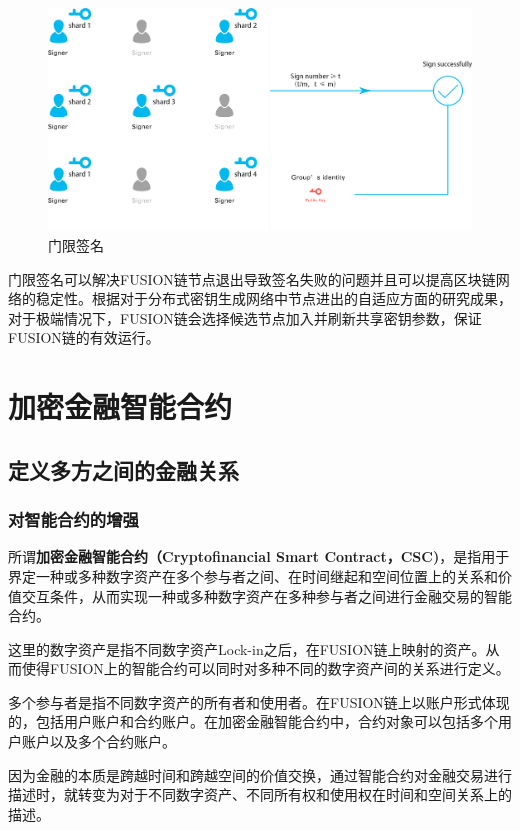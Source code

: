 \documentclass[a4paper,12pt]{article}
\begin{document}
\begin{figure}[htbp]
\centering\includegraphics[width=5in]{pic/thresholdsign.png}
\caption{门限签名}\label{fig:1}
\end{figure}

门限签名可以解决FUSION链节点退出导致签名失败的问题并且可以提高区块链网络的稳定性。根据对于分布式密钥生成网络中节点进出的自适应方面的研究成果\citep{Zhajun2010}，对于极端情况下，FUSION链会选择候选节点加入并刷新共享密钥参数，保证FUSION链的有效运行。

\section{加密金融智能合约}

\subsection{定义多方之间的金融关系}

\subsubsection{对智能合约的增强}

所谓{\bfseries{加密金融智能合约（Cryptofinancial Smart Contract，CSC)}}，是指用于界定一种或多种数字资产在多个参与者之间、在时间继起和空间位置上的关系和价值交互条件，从而实现一种或多种数字资产在多种参与者之间进行金融交易的智能合约。

这里的数字资产是指不同数字资产Lock-in之后，在FUSION链上映射的资产。从而使得FUSION上的智能合约可以同时对多种不同的数字资产间的关系进行定义。

多个参与者是指不同数字资产的所有者和使用者。在FUSION链上以账户形式体现的，包括用户账户和合约账户。在加密金融智能合约中，合约对象可以包括多个用户账户以及多个合约账户。

因为金融的本质是跨越时间和跨越空间的价值交换，通过智能合约对金融交易进行描述时，就转变为对于不同数字资产、不同所有权和使用权在时间和空间关系上的描述。
\end{document}
